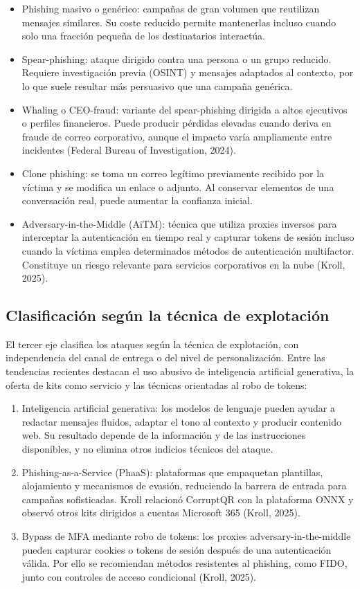 \documentclass[11pt,a4paper,oneside]{report}
\begin{document}
\begin{itemize}
  \item Phishing masivo o genérico: campañas de gran volumen que reutilizan mensajes similares. Su coste reducido permite mantenerlas incluso cuando solo una fracción pequeña de los destinatarios interactúa.
  \item Spear-phishing: ataque dirigido contra una persona o un grupo reducido. Requiere investigación previa (OSINT) y mensajes adaptados al contexto, por lo que suele resultar más persuasivo que una campaña genérica.
  \item Whaling o CEO-fraud: variante del spear-phishing dirigida a altos ejecutivos o perfiles financieros. Puede producir pérdidas elevadas cuando deriva en fraude de correo corporativo, aunque el impacto varía ampliamente entre incidentes (Federal Bureau of Investigation, 2024).
  \item Clone phishing: se toma un correo legítimo previamente recibido por la víctima y se modifica un enlace o adjunto. Al conservar elementos de una conversación real, puede aumentar la confianza inicial.
  \item Adversary-in-the-Middle (AiTM): técnica que utiliza proxies inversos para interceptar la autenticación en tiempo real y capturar tokens de sesión incluso cuando la víctima emplea determinados métodos de autenticación multifactor. Constituye un riesgo relevante para servicios corporativos en la nube (Kroll, 2025).
\end{itemize}

\subsection{Clasificación según la técnica de explotación}

El tercer eje clasifica los ataques según la técnica de explotación, con independencia del canal de entrega o del nivel de personalización. Entre las tendencias recientes destacan el uso abusivo de inteligencia artificial generativa, la oferta de kits como servicio y las técnicas orientadas al robo de tokens:

\begin{enumerate}
  \item Inteligencia artificial generativa: los modelos de lenguaje pueden ayudar a redactar mensajes fluidos, adaptar el tono al contexto y producir contenido web. Su resultado depende de la información y de las instrucciones disponibles, y no elimina otros indicios técnicos del ataque.
  \item Phishing-as-a-Service (PhaaS): plataformas que empaquetan plantillas, alojamiento y mecanismos de evasión, reduciendo la barrera de entrada para campañas sofisticadas. Kroll relacionó CorruptQR con la plataforma ONNX y observó otros kits dirigidos a cuentas Microsoft 365 (Kroll, 2025).
  \item Bypass de MFA mediante robo de tokens: los proxies adversary-in-the-middle pueden capturar cookies o tokens de sesión después de una autenticación válida. Por ello se recomiendan métodos resistentes al phishing, como FIDO, junto con controles de acceso condicional (Kroll, 2025).
\end{enumerate}
\end{document}
